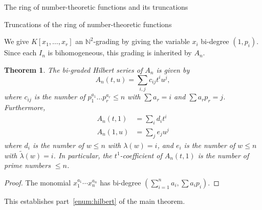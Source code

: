 \documentclass[reqno,10pt]{amsart}
\theoremstyle{definition}
\theoremstyle{remark}
\theoremstyle{plain}
\newtheorem{theorem}[definition]{Theorem}
\newcommand{\Nat}{{\mathbb{N}}}
\begin{document}
\begin{section}{The ring of number-theoretic functions  and its
  truncations}
\begin{subsection}{Truncations of the ring of number-theoretic
  functions}
  
  We give \(K[x_1,\dots,x_r]\) an \(\Nat^2\)-grading by giving the
  variable \(x_i\) bi-degree \((1,p_i)\). Since each \(I_n\) is
  bihomogeneous, this grading is inherited by \(A_n\).
  \begin{theorem}\label{thm:hilbert}
    The bi-graded Hilbert series of \(A_n\) is given by
    \begin{displaymath}
      A_n(t,u) = \sum_{i,j} c_{ij} t^i u^j, 
    \end{displaymath}
    where \(c_{ij}\) is the number of \(p_1^{a_1} \dots p_r^{a_r} 
    \le n\) with \(\sum a_r = i\) and \(\sum a_r p_r = j\).
    Furthermore, 
    \begin{align*}
      A_n(t,1) &= \sum_{i} d_{i} t^i \\
      A_n(1,u) &= \sum_{j} e_{j} u^j 
    \end{align*}
    where \(d_i\) is the number of \(w \le n\)
    with \(\lambda(w) = i\), and  
    \(e_i\) is the number of \(w \le n\)
    with \(\tilde{\lambda}(w) = i\). In particular, the 
    \(t^1\)-coefficient of \(A_n(t,1)\) is the number of prime numbers
    \(\le n\).
  \end{theorem}
  \begin{proof}
    The monomial \(x_1^{a_1}\cdots x_n^{a_n}\) has bi-degree
    \((\sum_{i=1}^n a_i, \sum a_i p_i)\).
  \end{proof}
  This establishes part~\ref{enum:hilbert} of the main theorem.   
\end{subsection}
\end{section}
\end{document}
